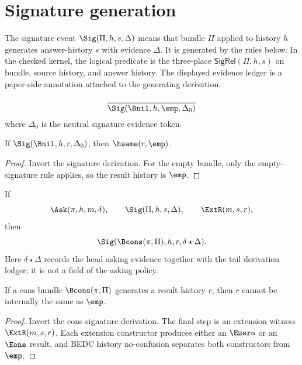 \section{Signature generation}

\begin{definition}
\label{def:signature-event}
The signature event \(\Sig(\Pi,h,s,\Delta)\) means that bundle \(\Pi\) applied to history \(h\) generates answer-history \(s\) with evidence \(\Delta\). It is generated by the rules below.
In the checked kernel, the logical predicate is the three-place $\mathsf{SigRel}(\Pi,h,s)$ on bundle, source history, and answer history. The displayed evidence ledger is a paper-side annotation attached to the generating derivation.
\end{definition}

\begin{kernelrule}
$$
\frac{}{\Sig(\Bnil,h,\emp,\Delta_0)}
$$
where \(\Delta_0\) is the neutral signature evidence token.
\end{kernelrule}

\begin{lemma}
\label{lem:empty-signature-inversion}
If \(\Sig(\Bnil,h,r,\Delta_0)\), then \(\hsame(r,\emp)\).
\end{lemma}
\begin{proof}
Invert the signature derivation. For the empty bundle, only the empty-signature rule applies, so the result history is \(\emp\).
\end{proof}

\begin{kernelrule}
If
$$
\Ask(\pi,h,m,\delta),
\qquad
\Sig(\Pi,h,s,\Delta),
\qquad
\ExtR(m,s,r),
$$
then
$$
\Sig(\Bcons(\pi,\Pi),h,r,\delta\star\Delta).
$$
Here \(\delta\star\Delta\) records the head asking evidence together with the tail derivation ledger; it is not a field of the asking policy.
\end{kernelrule}

\begin{theorem}
\label{thm:signature-cons-result-ne-empty}
If a cons bundle \(\Bcons(\pi,\Pi)\) generates a result history \(r\), then \(r\)
cannot be internally the same as \(\emp\).
\end{theorem}
\begin{proof}
Invert the cons signature derivation. The final step is an extension witness
\(\ExtR(m,s,r)\). Each extension constructor produces either an \(\Ezero\) or
an \(\Eone\) result, and BEDC history no-confusion separates both constructors
from \(\emp\).
\end{proof}

